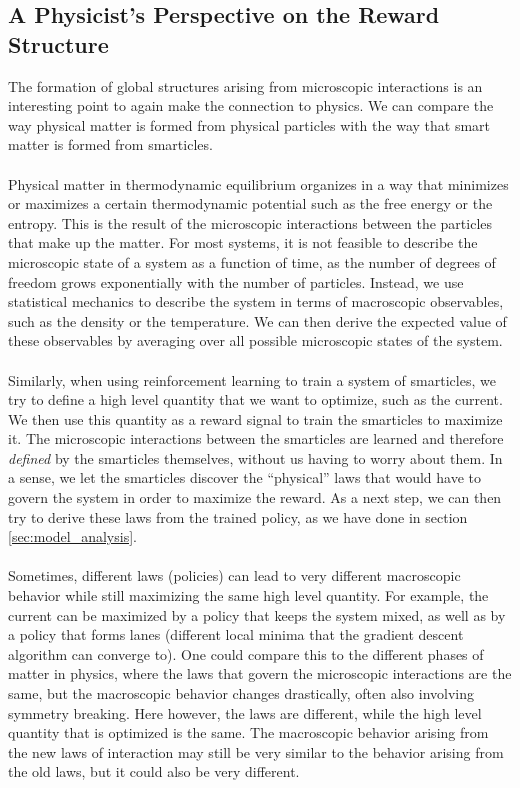 \subsection{A Physicist's Perspective on the Reward Structure}
\label{sec:physics_reward_structure}
The formation of global structures arising from microscopic interactions is an interesting point to again make the connection to physics. We can compare the way physical matter is formed from physical particles with the way that smart matter is formed from smarticles. 
\\
\\
Physical matter in thermodynamic equilibrium organizes in a way that minimizes or maximizes a certain thermodynamic potential such as the free energy or the entropy. This is the result of the microscopic interactions between the particles that make up the matter. For most systems, it is not feasible to describe the microscopic state of a system as a function of time, as the number of degrees of freedom grows exponentially with the number of particles. Instead, we use statistical mechanics to describe the system in terms of macroscopic observables, such as the density or the temperature. We can then derive the expected value of these observables by averaging over all possible microscopic states of the system.
\\
\\
Similarly, when using reinforcement learning to train a system of smarticles, we try to define a high level quantity that we want to optimize, such as the current. We then use this quantity as a reward signal to train the smarticles to maximize it. The microscopic interactions between the smarticles are learned and therefore \textit{defined} by the smarticles themselves, without us having to worry about them. In a sense, we let the smarticles discover the \enquote{physical} laws that would have to govern the system in order to maximize the reward. As a next step, we can then try to derive these laws from the trained policy, as we have done in section \ref{sec:model_analysis}.
\\
\\
Sometimes, different laws (policies) can lead to very different macroscopic behavior while still maximizing the same high level quantity. For example, the current can be maximized by a policy that keeps the system mixed, as well as by a policy that forms lanes (different local minima that the gradient descent algorithm can converge to). One could compare this to the different phases of matter in physics, where the laws that govern the microscopic interactions are the same, but the macroscopic behavior changes drastically, often also involving symmetry breaking. Here however, the laws are different, while the high level quantity that is optimized is the same. The macroscopic behavior arising from the new laws of interaction may still be very similar to the behavior arising from the old laws, but it could also be very different. 
